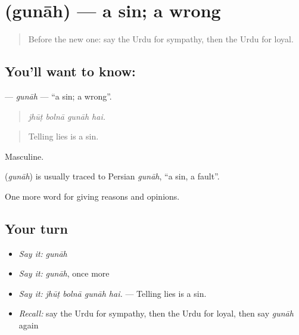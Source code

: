 \section[\texorpdfstring{\ur{گناہ} (gunāh)}{گناہ (gunāh)}]{ (gunāh) — a sin; a wrong}

\label{lesson:UR-C360-gunah}



\begin{quote}
Before the new one: say the Urdu for sympathy, then the Urdu for loyal.
\end{quote}

\subsection*{You'll want to know: }
\textbf{} — \emph{gunāh} — \textquotedblleft{}a sin; a wrong\textquotedblright{}.

\begin{quote}
   
\end{quote}

\begin{quote}
\emph{jhūṭ bolnā gunāh hai.}
\end{quote}

\begin{quote}
Telling lies is a sin.
\end{quote}

Masculine.

\begin{cousinweb}
\textbf{} (\emph{gunāh}) is usually traced to Persian \emph{gunāh}, \textquotedblleft{}a sin, a fault\textquotedblright{}.
\end{cousinweb}

\begin{grammarlens}[title={What you've built}]
One more word for giving reasons and opinions.
\end{grammarlens}

\subsection*{Your turn}
\begin{itemize}
\raggedright
  \item \emph{Say it:} \emph{gunāh}
  \item \emph{Say it:} \emph{gunāh}, once more
  \item \emph{Say it:} \emph{jhūṭ bolnā gunāh hai.} — Telling lies is a sin.
  \item \emph{Recall:} say the Urdu for sympathy, then the Urdu for loyal, then say \emph{gunāh} again
\end{itemize}

